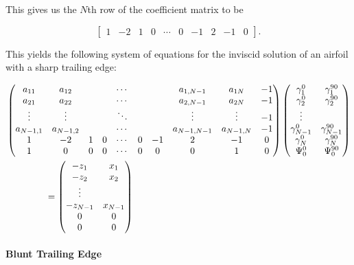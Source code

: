 \noindent This gives us the \(N\)th row of the coefficient matrix to be

\begin{equation}
	\begin{bmatrix}
		1 & -2 & 1 & 0 & \cdots & 0 & -1 & 2 & -1 & 0 
	\end{bmatrix}.
\end{equation}


\noindent This yields the following system of equations for the inviscid solution of an airfoil with a sharp trailing edge:

\begin{equation}
	\begin{split}
		&	\begin{pmatrix}
			a_{11} & a_{12} & & & \cdots & & & a_{1,N-1} & a_{1N} & -1 \\
			a_{21} & a_{22} & & & \cdots & & & a_{2,N-1} & a_{2N} & -1 \\
			\vdots & \vdots & & & \ddots & & & \vdots & \vdots & -1 \\
			a_{N-1,1} & a_{N-1,2} & & & \cdots & & & a_{N-1,N-1} & a_{N-1,N} & -1 \\
			1 & -2 & 1 & 0 & \cdots & 0 & -1 & 2 & -1 & 0 \\
			1 & 0 & 0 & 0 & \cdots & 0 & 0 & 0 & 1 & 0
		\end{pmatrix}
		\begin{pmatrix}
			\gamma^0_1 & \gamma^{90}_1 \\
			\gamma^0_2 & \gamma^{90}_2 \\
			\vdots \\
			\gamma^0_{N-1} & \gamma^{90}_{N-1} \\
			\gamma^0_N & \gamma^{90}_N \\
			\Psi^0_0 & \Psi^{90}_0\\
		\end{pmatrix} \\
		& \hspace{1.5cm} =
		\begin{pmatrix}
			-z_1 & x_1 \\
			-z_2 & x_2 \\
			\vdots \\
			-z_{N-1} & x_{N-1} \\
			0 & 0 \\
			0 & 0 
		\end{pmatrix}
	\end{split}
\end{equation}

\paragraph{Blunt Trailing Edge}

